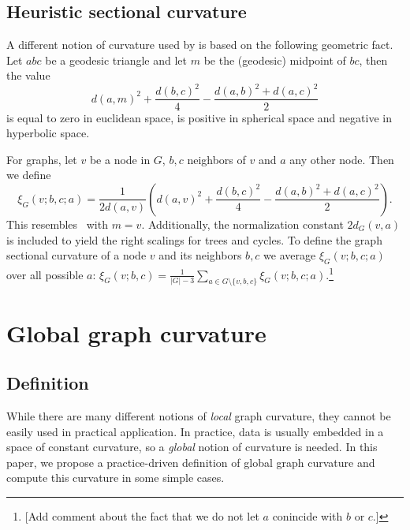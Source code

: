 \documentclass{article} %
\begin{document}
\subsection{Heuristic sectional curvature}

A different notion of curvature used by \citep{gu2019learning} is based on the following geometric fact. 
Let $abc$ be a geodesic triangle and let $m$ be the (geodesic) midpoint of $bc$, then the value
\begin{equation}\label{eq:parallelogram_law}
	d(a,m)^2 + \frac{d(b,c)^2}{4} - \frac{d(a,b)^2 + d(a,c)^2}{2}
\end{equation}
is equal to zero in euclidean space, is positive in spherical space and negative in hyperbolic space.

For graphs, let $v$ be a node in $G$, $b,c$ neighbors of $v$ and $a$ any other node. Then we define
\begin{equation}
\xi_G(v;b,c;a) = \frac{1}{2 d(a,v)} \left( 	d(a,v)^2 + \frac{d(b,c)^2}{4} - \frac{d(a,b)^2 + d(a,c)^2}{2} \right).
\end{equation}
This resembles~ with $m = v$. Additionally, the normalization constant $2d_G(v,a)$ is included to yield the right scalings for trees and cycles.
To define the graph sectional curvature of a node $v$ and its neighbors $b,c$ we average $\xi_G(v;b,c;a)$ over all possible $a$: 
$\xi_G(v; b,c) = \frac{1}{|G|-3} \sum_{a \in G\setminus \{v,b,c\}} \xi_G(v;b,c;a)$.\footnote{[Add comment about the fact that we do not let $a$ conincide with $b$ or $c$.]}


\section{Global graph curvature}

\subsection{Definition}

While there are many different notions of \textit{local} graph curvature, they cannot be easily used in practical application. In practice, data is usually embedded in a space of constant curvature, so a \textit{global} notion of curvature is needed. 
In this paper, we propose a practice-driven definition of global graph curvature and compute this curvature in some simple cases.
\end{document}

